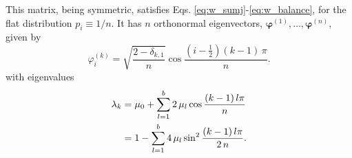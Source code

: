 \documentclass[reprint]{revtex4-1}
\begin{document}
This matrix, being symmetric,
satisfies Eqs. \eqref{eq:w_sumj}-\eqref{eq:w_balance},
for the flat distribution $p_i \equiv 1/n$.
%
It has $n$ orthonormal eigenvectors,
$\pmb\varphi^{(1)}, \dots, \pmb\varphi^{(n)}$,
given by
%
\begin{equation}
\varphi^{(k)}_i
= \sqrt{
    \frac{ 2 - \delta_{k, 1} }
         {       n           }
       }
  \cos \frac{ \left(i - \frac12\right) (k - 1) \, \pi}{n}.
\label{eq:wband_eigenvector}
\end{equation}
%
with eigenvalues
%
\begin{align}
  \lambda_k
  &=
  \mu_0 + \sum_{l = 1}^b 2 \, \mu_l \cos \frac{(k - 1)  \, l \pi}{n}
  \notag \\
  &=
  1 - \sum_{l = 1}^b 4 \, \mu_l \sin^2 \frac{(k - 1)  \, l \pi}{ 2 \, n }
  .
\label{eq:wband_eigenvalue}
\end{align}
%
\end{document}
